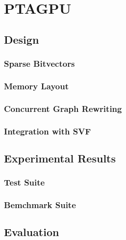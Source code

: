 \chapter{PTAGPU}
\section{Design}
\subsection{Sparse Bitvectors}
\subsection{Memory Layout}
\subsection{Concurrent Graph Rewriting}
\subsection{Integration with SVF}
\section{Experimental Results}
\subsection{Test Suite}
\subsection{Bemchmark Suite}
\section{Evaluation}
